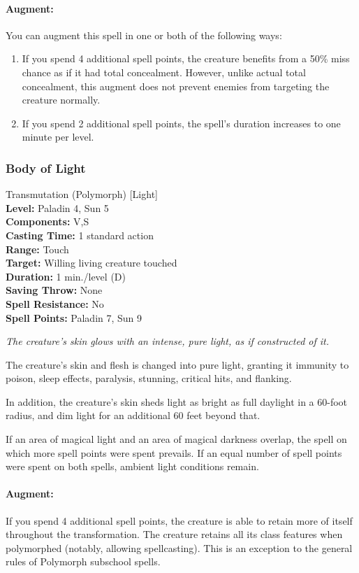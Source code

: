 \paragraph{Augment:} You can augment this spell in one or both of the following ways:
\begin{enumerate}
 \item If you spend 4 additional spell points, the creature benefits from a 50\% miss chance as if it had total concealment. 
However, unlike actual total concealment, this augment does not prevent enemies from targeting the creature normally.
 \item If you spend 2 additional spell points, the spell's duration increases to one minute per level.
\end{enumerate}
\subsubsection{Body of Light}
\label{Spell:BodyOfLight}
Transmutation (Polymorph) [Light]
\\ \textbf{Level:} Paladin 4, Sun 5
\\ \textbf{Components:} V,S
\\ \textbf{Casting Time:} 1 standard action
\\ \textbf{Range:} Touch
\\ \textbf{Target:} Willing living creature touched
\\ \textbf{Duration:} 1 min./level (D)
\\ \textbf{Saving Throw:} None
\\ \textbf{Spell Resistance:} No
\\ \textbf{Spell Points:} Paladin 7, Sun 9

\emph{The creature's skin glows with an intense, pure light, as if constructed of it.}

The creature's skin and flesh is changed into pure light, granting it immunity to poison, sleep effects, paralysis, stunning, critical hits, and flanking.

In addition, the creature's skin sheds light as bright as full daylight in a 60-foot radius, and dim light for an additional 60 feet beyond that. 

If an area of magical light and an area of magical darkness overlap, 
the spell on which more spell points were spent prevails.
If an equal number of spell points were spent on both spells, ambient light conditions remain.

\paragraph{Augment:} If you spend 4 additional spell points, the creature is able to retain more of itself throughout the transformation.
The creature retains all its class features when polymorphed (notably, allowing spellcasting).
This is an exception to the general rules of Polymorph subschool spells.

